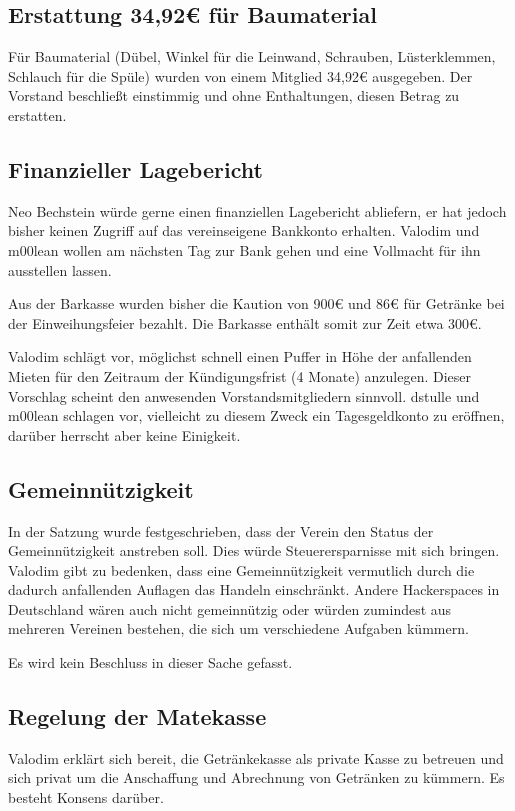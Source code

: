 \documentclass[a4paper,12pt]{scrartcl}
\begin{document}
\subsection{Erstattung 34{,}92€ für Baumaterial}
Für Baumaterial (Dübel, Winkel für die Leinwand, Schrauben, Lüsterklemmen,
Schlauch für die Spüle) wurden von einem Mitglied 34{,}92€ ausgegeben. Der
Vorstand beschließt einstimmig und ohne Enthaltungen, diesen Betrag zu
erstatten.

\subsection{Finanzieller Lagebericht}
Neo Bechstein würde gerne einen finanziellen Lagebericht abliefern, er hat
jedoch bisher keinen Zugriff auf das vereinseigene Bankkonto erhalten. Valodim
und m00lean wollen am nächsten Tag zur Bank gehen und eine Vollmacht für ihn
ausstellen lassen.

Aus der Barkasse wurden bisher die Kaution von 900€ und 86€ für Getränke bei der
Einweihungsfeier bezahlt. Die Barkasse enthält somit zur Zeit etwa 300€.

Valodim schlägt vor, möglichst schnell einen Puffer in Höhe der anfallenden
Mieten für den Zeitraum der Kündigungsfrist (4 Monate) anzulegen. Dieser
Vorschlag scheint den anwesenden Vorstandsmitgliedern sinnvoll. dstulle und
m00lean schlagen vor, vielleicht zu diesem Zweck ein Tagesgeldkonto zu eröffnen,
darüber herrscht aber keine Einigkeit.

\subsection{Gemeinnützigkeit}
In der Satzung wurde festgeschrieben, dass der Verein den Status der
Gemeinnützigkeit anstreben soll. Dies würde Steuerersparnisse mit sich bringen.
Valodim gibt zu bedenken, dass eine Gemeinnützigkeit vermutlich durch die
dadurch anfallenden Auflagen das Handeln einschränkt. Andere Hackerspaces in
Deutschland wären auch nicht gemeinnützig oder würden zumindest aus mehreren
Vereinen bestehen, die sich um verschiedene Aufgaben kümmern.

Es wird kein Beschluss in dieser Sache gefasst.

\subsection{Regelung der Matekasse}
Valodim erklärt sich bereit, die Getränkekasse als private Kasse zu betreuen
und sich privat um die Anschaffung und Abrechnung von Getränken zu kümmern. Es
besteht Konsens darüber.
\end{document}
